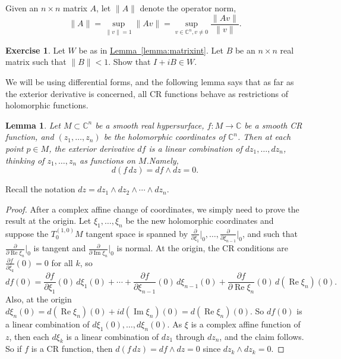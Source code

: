 \documentclass[12pt,openany]{book}
\renewcommand{\Re}{\operatorname{Re}}
\renewcommand{\Im}{\operatorname{Im}}
\newcommand{\snorm}[1]{\lVert {#1} \rVert}
\newcommand{\C}{{\mathbb{C}}}
\theoremstyle{plain}
\newtheorem{lemma}[thm]{Lemma}
\theoremstyle{remark}
\theoremstyle{definition}
\newenvironment{exbox}{%
    \def\FrameCommand{\vrule width 1pt \relax\hspace{10pt}}%
    \MakeFramed{\advance\hsize-\width\FrameRestore}%
}{%
    \endMakeFramed
}
\theoremstyle{exercise}
\newtheorem{exercise}{Exercise}[section]
\theoremstyle{example}
\newcommand{\lemmaref}[1]{\hyperref[#1]{Lemma~\ref*{#1}}}
\begin{document}
Given an $n \times n$ matrix $A$, let $\snorm{A}$ denote the operator norm,
\begin{equation*}
\snorm{A} = \sup_{\snorm{v}=1} \snorm{Av} = \sup_{v \in \C^n, v\not= 0}
\frac{\snorm{Av}}{\snorm{v}} .
\end{equation*}

\begin{exbox}
\begin{exercise}
Let $W$ be as in \lemmaref{lemma:matrixint}.  Let $B$ be an $n \times n$
real matrix such that $\snorm{B} < 1$.   Show that $I + iB \in W$.
\end{exercise}
\end{exbox}

We will be using differential forms, and the following lemma says
that as far as the exterior
derivative is concerned, all CR functions behave as
restrictions of holomorphic functions.

\begin{lemma} \label{lemma:crdf}
Let $M \subset \C^n$ be a smooth real hypersurface, $f \colon M \to \C$
be a smooth CR function, and $(z_1,\ldots,z_n)$ be the holomorphic
coordinates of $\C^n$.  Then at each point $p \in M$,
the exterior derivative
$df$ is a linear combination of $dz_1,\ldots,dz_n$,
thinking of $z_1,\ldots,z_n$ as functions on $M$.\linebreak[1]
Namely,
\begin{equation*}
d(f \, dz) = df \wedge dz = 0.
\end{equation*}
\end{lemma}

Recall the notation $dz = dz_1 \wedge dz_2 \wedge \cdots \wedge dz_n$.

\begin{proof}
After a complex affine change of coordinates, we simply
need to prove the result at the origin.  Let
$\xi_1,\ldots,\xi_n$ be
the new holomorphic coordinates
and suppose the $T^{(1,0)}_0 M$ tangent space is spanned
by
$\frac{\partial}{\partial \xi_1}\big|_0,
\ldots,
\frac{\partial}{\partial \xi_{n-1}}\big|_0$,
and such that $\frac{\partial}{\partial \Re \xi_n}\big|_0$ is tangent
and $\frac{\partial}{\partial \Im \xi_n}\big|_0$ is normal.
At the origin, the CR conditions are
$\frac{\partial f}{\partial \bar{\xi}_k}(0) = 0$ for all $k$, so
\begin{equation*}
df(0) =
\frac{\partial f}{\partial \xi_1}(0) \, d\xi_1(0) + \cdots +
\frac{\partial f}{\partial \xi_{n-1}}(0) \, d\xi_{n-1}(0)  +
\frac{\partial f}{\partial \Re \xi_{n}}(0) \, d(\Re \xi_{n})(0)
.
\end{equation*}
Also, at the origin $d\xi_n(0) = d(\Re \xi_n)(0) + i d(\Im \xi_n)(0) = d(\Re \xi_n)(0)$.
So $df(0)$ is a linear combination of $d\xi_1(0),\ldots,d\xi_n(0)$.
As $\xi$ is a complex affine function of $z$, then each $d\xi_k$ is a linear
combination of $dz_1$ through $dz_n$, and the claim follows.
So if $f$ is a CR function, then
$d(f\,dz) = df \wedge dz = 0$ since $dz_k \wedge dz_k = 0$.
\end{proof}
\end{document}
